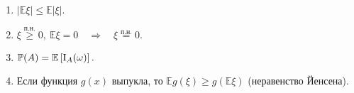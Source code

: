 \begin{namedthm}
\begin{enumerate}
    {\bf Замечание.}
        Обратное неверно: из равенства $\mathbb{E}(\xi \eta) = \mathbb{E}\xi \mathbb{E} \eta$ {\it не следует} независимость величин $\xi$ и $\eta$.
    
    \item $|\mathbb{E}\xi| \leqslant \mathbb{E}|\xi|.$
    
    \item $\xi \overset{\text{п.н.}}{\geqslant} 0, \: \mathbb{E}\xi = 0 \quad \Rightarrow \quad \xi \overset{\text{п.н.}}{=} 0.$
    
    \item ${\mathbb{P}(A)} = \mathbb{E}\left[\mathrm{I}_A(\omega)\right].$
    
    \item Если функция $g(x)$ выпукла, то $\mathbb{E}g(\xi) \geqslant g(\mathbb{E}\xi)$ (неравенство Йенсена).
    
\end{enumerate}
\end{namedthm}

